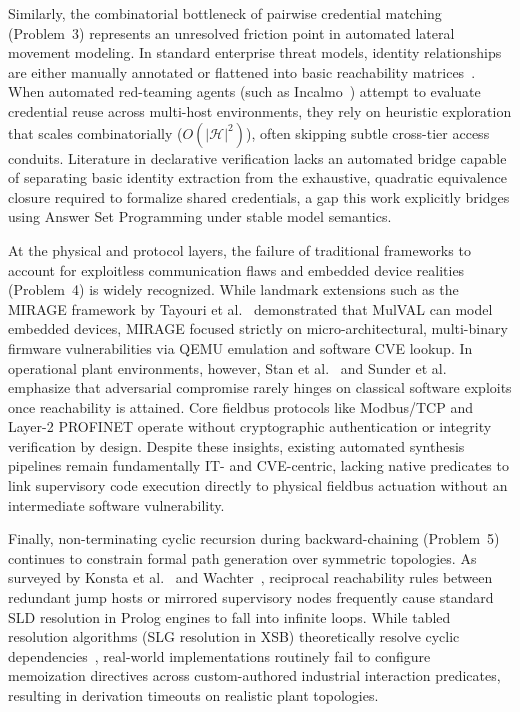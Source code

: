 \documentclass[target=mst,aauheader=aics,style=]{thud}
\begin{document}
Similarly, the combinatorial bottleneck of pairwise credential matching (Problem~3) represents an unresolved friction point in automated lateral movement modeling. In standard enterprise threat models, identity relationships are either manually annotated or flattened into basic reachability matrices~\cite{Ou05, WachterSurvey}. When automated red-teaming agents (such as Incalmo~\cite{SingerIncalmo}) attempt to evaluate credential reuse across multi-host environments, they rely on heuristic exploration that scales combinatorially ($O(|\mathcal{H}|^2)$), often skipping subtle cross-tier access conduits. Literature in declarative verification lacks an automated bridge capable of separating basic identity extraction from the exhaustive, quadratic equivalence closure required to formalize shared credentials, a gap this work explicitly bridges using Answer Set Programming under stable model semantics.

At the physical and protocol layers, the failure of traditional frameworks to account for exploitless communication flaws and embedded device realities (Problem~4) is widely recognized. While landmark extensions such as the MIRAGE framework by Tayouri et al.~\cite{TayouriMIRAGE} demonstrated that MulVAL can model embedded devices, MIRAGE focused strictly on micro-architectural, multi-binary firmware vulnerabilities via QEMU emulation and software CVE lookup. In operational plant environments, however, Stan et al.~\cite{StanExtended} and Sunder et al.~\cite{SunderOT} emphasize that adversarial compromise rarely hinges on classical software exploits once reachability is attained. Core fieldbus protocols like Modbus/TCP and Layer-2 PROFINET operate without cryptographic authentication or integrity verification by design. Despite these insights, existing automated synthesis pipelines remain fundamentally IT- and CVE-centric, lacking native predicates to link supervisory code execution directly to physical fieldbus actuation without an intermediate software vulnerability.

Finally, non-terminating cyclic recursion during backward-chaining (Problem~5) continues to constrain formal path generation over symmetric topologies. As surveyed by Konsta et al.~\cite{KonstaSurvey} and Wachter~\cite{WachterSurvey}, reciprocal reachability rules between redundant jump hosts or mirrored supervisory nodes frequently cause standard SLD resolution in Prolog engines to fall into infinite loops. While tabled resolution algorithms (SLG resolution in XSB) theoretically resolve cyclic dependencies~\cite{swift2012xsb}, real-world implementations routinely fail to configure memoization directives across custom-authored industrial interaction predicates, resulting in derivation timeouts on realistic plant topologies.
\end{document}
